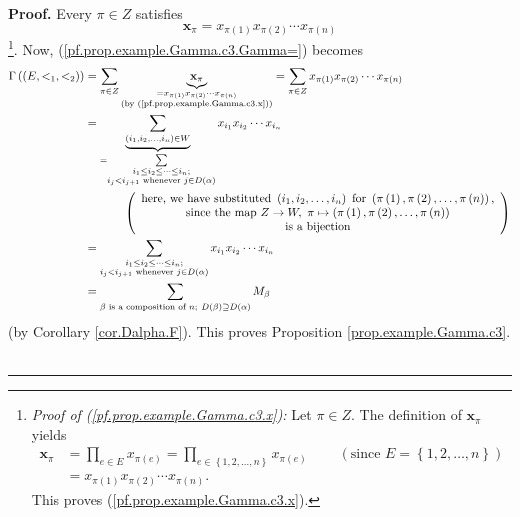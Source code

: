 \documentclass[numbers=enddot,12pt,final,onecolumn,notitlepage,abstracton]{scrartcl}
\theoremstyle{definition}
\newenvironment{proof}[1][Proof]{\noindent\textbf{#1.} }{\ \rule{0.5em}{0.5em}}
\let\sumnonlimits\sum
\let\prodnonlimits\prod
\renewcommand{\sum}{\sumnonlimits\limits}
\renewcommand{\prod}{\prodnonlimits\limits}
\newenvironment{verlong}{}{}
\begin{document}
\begin{verlong}
\begin{footnotesize}
\begin{proof}
Every $\pi\in Z$ satisfies%
\begin{equation}
\mathbf{x}_{\pi}=x_{\pi\left(  1\right)  }x_{\pi\left(  2\right)  }\cdots
x_{\pi\left(  n\right)  } \label{pf.prop.example.Gamma.c3.x}%
\end{equation}
\footnote{\textit{Proof of (\ref{pf.prop.example.Gamma.c3.x}):} Let $\pi\in
Z$. The definition of $\mathbf{x}_{\pi}$ yields%
\begin{align*}
{\mathbf{x}}_{\pi}  &  =\prod_{e\in E}x_{\pi\left(  e\right)  }=\prod
_{e\in\left\{  1,2,\ldots,n\right\}  }x_{\pi\left(  e\right)  }%
\ \ \ \ \ \ \ \ \ \ \left(  \text{since }E=\left\{  1,2,\ldots,n\right\}
\right) \\
&  =x_{\pi\left(  1\right)  }x_{\pi\left(  2\right)  }\cdots x_{\pi\left(
n\right)  }.
\end{align*}
This proves (\ref{pf.prop.example.Gamma.c3.x}).}. Now,
(\ref{pf.prop.example.Gamma.c3.Gamma=}) becomes%
\begin{align*}
\Gamma\left(  \left(  E,<_{1},<_{2}\right)  \right)   &  =\sum_{\pi\in
Z}\underbrace{\mathbf{x}_{\pi}}_{\substack{=x_{\pi\left(  1\right)  }%
x_{\pi\left(  2\right)  }\cdots x_{\pi\left(  n\right)  }\\\text{(by
(\ref{pf.prop.example.Gamma.c3.x}))}}}=\sum_{\pi\in Z}x_{\pi\left(  1\right)
}x_{\pi\left(  2\right)  }\cdots x_{\pi\left(  n\right)  }\\
&  =\underbrace{\sum_{\left(  i_{1},i_{2},\ldots,i_{n}\right)  \in W}}%
_{=\sum_{\substack{i_{1}\leq i_{2}\leq\cdots\leq i_{n};\\i_{j}<i_{j+1}\text{
whenever }j\in D\left(  \alpha\right)  }}}x_{i_{1}}x_{i_{2}}\cdots x_{i_{n}}\\
&  \ \ \ \ \ \ \ \ \ \ \left(
\begin{array}
[c]{c}%
\text{here, we have substituted }\left(  i_{1},i_{2},\ldots,i_{n}\right)
\text{ for }\left(  \pi\left(  1\right)  ,\pi\left(  2\right)  ,\ldots
,\pi\left(  n\right)  \right)  \text{,}\\
\text{since the map }Z\rightarrow W,\ \pi\mapsto\left(  \pi\left(  1\right)
,\pi\left(  2\right)  ,\ldots,\pi\left(  n\right)  \right) \\
\text{is a bijection}%
\end{array}
\right) \\
&  =\sum_{\substack{i_{1}\leq i_{2}\leq\cdots\leq i_{n};\\i_{j}<i_{j+1}\text{
whenever }j\in D\left(  \alpha\right)  }}x_{i_{1}}x_{i_{2}}\cdots x_{i_{n}}\\
&  =\sum_{\beta\text{ is a composition of }n;\ D\left(  \beta\right)
\supseteq D\left(  \alpha\right)  }M_{\beta}%
\end{align*}
(by Corollary \ref{cor.Dalpha.F}). This proves Proposition
\ref{prop.example.Gamma.c3}.
\end{proof}


\end{footnotesize}
\end{verlong}
\end{document}
